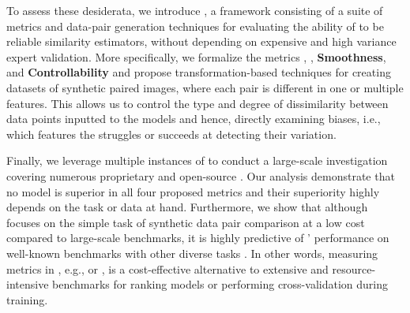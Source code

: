 To assess these desiderata, we introduce \mmscore{}, a framework consisting of a suite of metrics and data-pair generation techniques for evaluating the ability of \modelss{} to be reliable similarity estimators, without depending on expensive and high variance expert validation.
More specifically, we formalize the metrics \nmi, \relaxsym, \textbf{Smoothness}, and \textbf{Controllability} 
and propose transformation-based techniques for creating datasets of synthetic paired images, where each pair is different in one or multiple features. 
This allows us to control the type and degree of dissimilarity between data points inputted to the models and hence, directly examining biases, i.e., which features the \model{} struggles or succeeds at detecting their variation.



Finally, we leverage multiple instances of \mmscore{} to conduct a large-scale investigation covering numerous proprietary and open-source \modelss{}. 
Our analysis demonstrate that no model is superior in all four proposed metrics and their superiority highly depends on the task or data at hand. 
Furthermore, we show that although \mmscore{} focuses on the simple task of synthetic data pair comparison at a low cost compared to large-scale benchmarks, it is highly predictive of \modelss{}' performance on well-known benchmarks with other diverse tasks \cite{yue2024mmmu, lu2023mathvista, chen2024we, guan2024hallusionbench, liu2024ocrbench, kembhavi2016diagram}. 
In other words, measuring metrics in \mmscore{}, e.g., \nmi or \relaxsym,  is a cost-effective alternative to extensive and resource-intensive benchmarks for ranking models or performing cross-validation during training.

